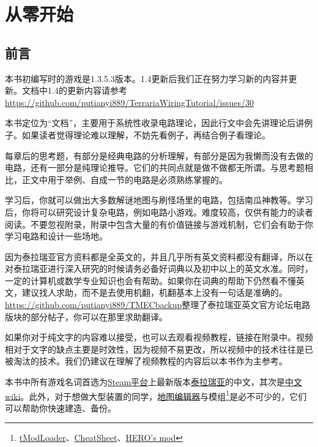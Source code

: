 \chapter{从零开始}

\section{前言}\label{sec1:1}
\begin{note}
本书初编写时的游戏是1.3.5.3版本。1.4更新后我们正在努力学习新的内容并更新。文档中1.4的更新内容请参考\url{https://github.com/putianyi889/TerrariaWiringTutorial/issues/30}
\end{note}

本书定位为“文档”，主要用于系统性收录电路理论，因此行文中会先讲理论后讲例子。如果读者觉得理论难以理解，不妨先看例子，再结合例子看理论。

每章后的思考题，有部分是经典电路的分析理解，有部分是因为我懒而没有去做的电路，还有一部分是纯理论推导。它们的共同点就是做不做都无所谓。与思考题相比，正文中用于举例、自成一节的电路是必须熟练掌握的。

学习后，你就可以做出大多数解谜地图与刷怪场里的电路，包括南瓜神教等。学习后，你将可以研究设计复杂电路，例如电路小游戏。难度较高，仅供有能力的读者阅读。不要忽视附录，附录中包含大量的有价值链接与游戏机制，它们会有助于你学习电路和设计一些场地。

因为泰拉瑞亚官方资料都是全英文的，并且几乎所有英文资料都没有翻译，所以在对泰拉瑞亚进行深入研究的时候请务必备好词典以及初中以上的英文水准。同时，一定的计算机或数学专业知识也会有帮助。如果你在词典的帮助下仍然看不懂英文，建议找人求助，而不是去使用机翻，机翻基本上没有一句话是准确的。\url{https://github.com/putianyi889/TMECbackup}整理了泰拉瑞亚英文官方论坛电路版块的部分帖子，你可以在那里求助翻译。

如果你对于纯文字的内容难以接受，也可以去观看视频教程，链接在附录中。视频相对于文字的缺点主要是时效性，因为视频不易更改，所以视频中的技术往往是已被淘汰的技术。我们仍建议在理解了视频教程的内容后以本书作为主参考。

本书中所有游戏名词首选为\href{https://store.steampowered.com/}{Steam平台}上最新版本\href{https://store.steampowered.com/app/105600/Terraria/}{泰拉瑞亚}的中文，其次是\href{https://terraria-zh.gamepedia.com/index.php?title=Terraria_Wiki&variant=zh}{中文wiki}。此外，对于想做大型装置的同学，\hyperref[app3]{地图编辑器}与模组\footnote{\hyperref[app4]{tModLoader}、\hyperref[app5]{CheatSheet}、\hyperref[app6]{HERO's mod}}是必不可少的，它们可以帮助你快速建造、备份。

